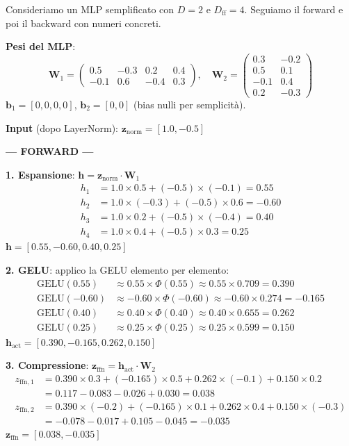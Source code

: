 \documentclass[12pt,a4paper]{article}
\begin{document}
\begin{examplebox}
Consideriamo un MLP semplificato con $D = 2$ e $D_{\text{ff}} = 4$. Seguiamo il forward e poi il backward con numeri concreti.

\textbf{Pesi del MLP}:
\[
\mathbf{W}_1 = \begin{pmatrix} 0.5 & -0.3 & 0.2 & 0.4 \\ -0.1 & 0.6 & -0.4 & 0.3 \end{pmatrix}, \quad
\mathbf{W}_2 = \begin{pmatrix} 0.3 & -0.2 \\ 0.5 & 0.1 \\ -0.1 & 0.4 \\ 0.2 & -0.3 \end{pmatrix}
\]
$\mathbf{b}_1 = [0, 0, 0, 0]$, $\mathbf{b}_2 = [0, 0]$ (bias nulli per semplicit\`a).

\textbf{Input} (dopo LayerNorm): $\mathbf{z}_{\text{norm}} = [1.0, -0.5]$

\textbf{--- FORWARD ---}

\textbf{1. Espansione}: $\mathbf{h} = \mathbf{z}_{\text{norm}} \cdot \mathbf{W}_1$
\begin{align*}
h_1 &= 1.0 \times 0.5 + (-0.5) \times (-0.1) = 0.55 \\
h_2 &= 1.0 \times (-0.3) + (-0.5) \times 0.6 = -0.60 \\
h_3 &= 1.0 \times 0.2 + (-0.5) \times (-0.4) = 0.40 \\
h_4 &= 1.0 \times 0.4 + (-0.5) \times 0.3 = 0.25
\end{align*}
$\mathbf{h} = [0.55, -0.60, 0.40, 0.25]$

\textbf{2. GELU}: applico la GELU elemento per elemento:
\begin{align*}
\text{GELU}(0.55) &\approx 0.55 \times \Phi(0.55) \approx 0.55 \times 0.709 = 0.390 \\
\text{GELU}(-0.60) &\approx -0.60 \times \Phi(-0.60) \approx -0.60 \times 0.274 = -0.165 \\
\text{GELU}(0.40) &\approx 0.40 \times \Phi(0.40) \approx 0.40 \times 0.655 = 0.262 \\
\text{GELU}(0.25) &\approx 0.25 \times \Phi(0.25) \approx 0.25 \times 0.599 = 0.150
\end{align*}
$\mathbf{h}_{\text{act}} = [0.390, -0.165, 0.262, 0.150]$

\textbf{3. Compressione}: $\mathbf{z}_{\text{ffn}} = \mathbf{h}_{\text{act}} \cdot \mathbf{W}_2$
\begin{align*}
z_{\text{ffn},1} &= 0.390 \times 0.3 + (-0.165) \times 0.5 + 0.262 \times (-0.1) + 0.150 \times 0.2 \\
&= 0.117 - 0.083 - 0.026 + 0.030 = 0.038 \\
z_{\text{ffn},2} &= 0.390 \times (-0.2) + (-0.165) \times 0.1 + 0.262 \times 0.4 + 0.150 \times (-0.3) \\
&= -0.078 - 0.017 + 0.105 - 0.045 = -0.035
\end{align*}
$\mathbf{z}_{\text{ffn}} = [0.038, -0.035]$


\end{examplebox}
\end{document}
